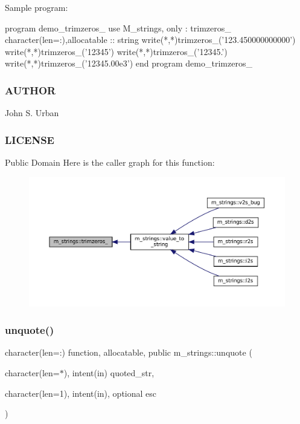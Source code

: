 Sample program\+: \begin{DoxyVerb}program demo_trimzeros_
use M_strings, only : trimzeros_
character(len=:),allocatable :: string
   write(*,*)trimzeros_('123.450000000000')
   write(*,*)trimzeros_('12345')
   write(*,*)trimzeros_('12345.')
   write(*,*)trimzeros_('12345.00e3')
end program demo_trimzeros_
\end{DoxyVerb}


\subsubsection*{A\+U\+T\+H\+OR}

John S. Urban \subsubsection*{L\+I\+C\+E\+N\+SE}

Public Domain Here is the caller graph for this function\+:
\nopagebreak
\begin{figure}[H]
\begin{center}
\leavevmode
\includegraphics[width=350pt]{namespacem__strings_aedbeefa963a63edc16b10e2a833eb609_icgraph}
\end{center}
\end{figure}
\mbox{\label{namespacem__strings_acb88c65d5df2d5b3e55df2d2dab57390}} 
\subsubsection{\texorpdfstring{unquote()}{unquote()}}
{\footnotesize\ttfamily character(len=\+:) function, allocatable, public m\+\_\+strings\+::unquote (\begin{DoxyParamCaption}\item[{character(len=$\ast$), intent(in)}]{quoted\+\_\+str,  }\item[{character(len=1), intent(in), optional}]{esc }\end{DoxyParamCaption})}



